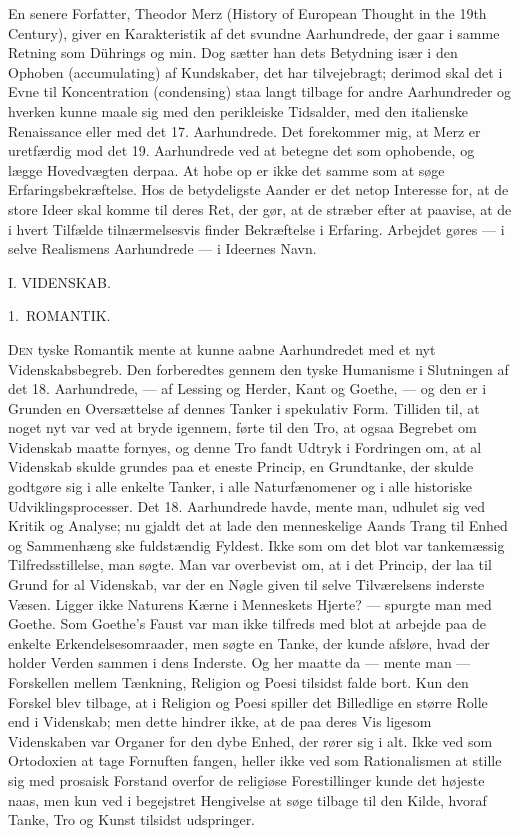 \documentclass[12pt,a4paper,openany]{book}
\newcommand{\opage}[1]{\marginnote{\footnotesize\textit{[#1]}}}
\newcommand{\parthead}[1]{\par\bigskip\phantomsection\begin{center}{\Large #1}\end{center}\addcontentsline{toc}{part}{#1}\medskip}
\newcommand{\chapterhead}[2]{\par\bigskip\phantomsection\begin{center}{\large #1\ #2}\end{center}\addcontentsline{toc}{chapter}{#1 #2}\medskip}
\begin{document}
En senere Forfatter, Theodor Merz (History of European Thought
in the 19th Century), giver en Karakteristik af det svundne Aarhundrede,
der gaar i samme Retning som Dührings og min. Dog
sætter han dets Betydning især i den Ophoben (accumulating) af
Kundskaber, det har tilvejebragt; derimod skal det i Evne til Koncentration
(condensing) staa langt tilbage for andre Aarhundreder
og hverken kunne maale sig med den perikleiske Tidsalder, med den
italienske Renaissance eller med det 17. Aarhundrede. Det forekommer
mig, at Merz er uretfærdig mod det 19. Aarhundrede ved at
betegne det som ophobende, og lægge Hovedvægten derpaa. At hobe
op er ikke det samme som at søge Erfaringsbekræftelse. Hos de betydeligste
Aander er det netop Interesse for, at de store Ideer skal
komme til deres Ret, der gør, at de stræber efter at paavise, at de i
hvert Tilfælde tilnærmelsesvis finder Bekræftelse i Erfaring. Arbejdet
gøres --- i selve Realismens Aarhundrede --- i Ideernes Navn.

\parthead{I. VIDENSKAB.}
\chapterhead{1.}{ROMANTIK.}

\opage{6}D\textsc{en} tyske Romantik mente at kunne aabne Aarhundredet med et
nyt Videnskabsbegreb. Den forberedtes gennem den tyske Humanisme
i Slutningen af det 18. Aarhundrede, --- af Lessing og Herder,
Kant og Goethe, --- og den er i Grunden en Oversættelse af dennes
Tanker i spekulativ Form. Tilliden til, at noget nyt var ved at bryde
igennem, førte til den Tro, at ogsaa Begrebet om Videnskab maatte
fornyes, og denne Tro fandt Udtryk i Fordringen om, at al Videnskab
skulde grundes paa et eneste Princip, en Grundtanke, der skulde
godtgøre sig i alle enkelte Tanker, i alle Naturfænomener og i alle
historiske Udviklingsprocesser. Det 18. Aarhundrede havde, mente
man, udhulet sig ved Kritik og Analyse; nu gjaldt det at lade den
menneskelige Aands Trang til Enhed og Sammenhæng ske fuldstændig
Fyldest. Ikke som om det blot var tankemæssig Tilfredsstillelse,
man søgte. Man var overbevist om, at i det Princip, der laa til Grund
for al Videnskab, var der en Nøgle given til selve Tilværelsens inderste
Væsen. Ligger ikke Naturens Kærne i Menneskets Hjerte?
--- spurgte man med Goethe. Som Goethe’s Faust var man ikke tilfreds
med blot at arbejde paa de enkelte Erkendelsesomraader, men søgte
en Tanke, der kunde afsløre, hvad der holder Verden sammen i dens
Inderste. Og her maatte da --- mente man --- Forskellen mellem
Tænkning, Religion og Poesi tilsidst falde bort. Kun den Forskel blev
tilbage, at i Religion og Poesi spiller det Billedlige en større Rolle
end i Videnskab; men dette hindrer ikke, at de paa deres Vis ligesom
Videnskaben var Organer for den dybe Enhed, der rører sig i alt.
Ikke ved som Ortodoxien at tage Fornuften fangen, heller ikke ved
som Rationalismen at stille sig med prosaisk Forstand overfor de
religiøse Forestillinger kunde det højeste naas, men kun ved i begejstret
Hengivelse at søge tilbage til den Kilde, hvoraf Tanke, Tro og
Kunst tilsidst udspringer.
\end{document}

